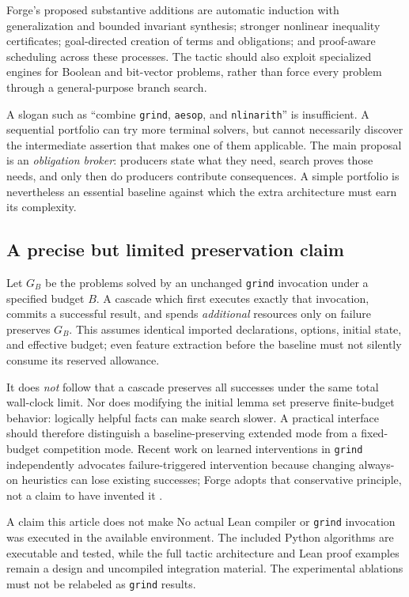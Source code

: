 \documentclass[11pt,a4paper]{article}
\newcommand{\grind}{\texttt{grind}}
\newcommand{\code}[1]{\texttt{#1}}
\begin{document}
Forge's proposed substantive additions are automatic induction with generalization and bounded invariant synthesis; stronger nonlinear inequality certificates; goal-directed creation of terms and obligations; and proof-aware scheduling across these processes. The tactic should also exploit specialized engines for Boolean and bit-vector problems, rather than force every problem through a general-purpose branch search.

A slogan such as ``combine \grind, \code{aesop}, and \code{nlinarith}'' is insufficient. A sequential portfolio can try more terminal solvers, but cannot necessarily discover the intermediate assertion that makes one of them applicable. The main proposal is an \emph{obligation broker}: producers state what they need, search proves those needs, and only then do producers contribute consequences. A simple portfolio is nevertheless an essential baseline against which the extra architecture must earn its complexity.

\subsection{A precise but limited preservation claim}
Let $G_B$ be the problems solved by an unchanged \grind{} invocation under a specified budget $B$. A cascade which first executes exactly that invocation, commits a successful result, and spends \emph{additional} resources only on failure preserves $G_B$. This assumes identical imported declarations, options, initial state, and effective budget; even feature extraction before the baseline must not silently consume its reserved allowance.

It does \emph{not} follow that a cascade preserves all successes under the same total wall-clock limit. Nor does modifying the initial lemma set preserve finite-budget behavior: logically helpful facts can make search slower. A practical interface should therefore distinguish a baseline-preserving extended mode from a fixed-budget competition mode. Recent work on learned interventions in \grind{} independently advocates failure-triggered intervention because changing always-on heuristics can lose existing successes; Forge adopts that conservative principle, not a claim to have invented it \cite{interventions}.

\begin{noteBox}{A claim this article does not make}
No actual Lean compiler or \grind{} invocation was executed in the available environment. The included Python algorithms are executable and tested, while the full tactic architecture and Lean proof examples remain a design and uncompiled integration material. The experimental ablations must not be relabeled as \grind{} results.
\end{noteBox}
\end{document}
